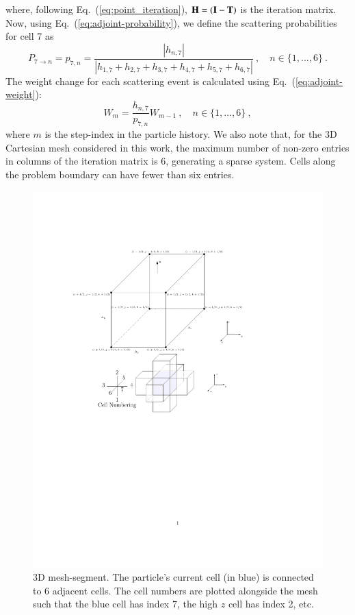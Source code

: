 \documentclass[preprint,12pt]{elsarticle}
\newcommand{\vI}{\ensuremath{\ve{I}}}
\begin{document}
where, following Eq.~(\ref{eq:point_iteration}), $\ve{H} = (\vI - \ve{T})$ is
the iteration matrix.  Now, using Eq.~(\ref{eq:adjoint-probability}), we
define the scattering probabilities for cell 7 as
\begin{equation*}
  P_{7\rightarrow n} = p_{7,n} = \frac{|h_{n,7}|}{|h_{1,7} + h_{2,7} +
    h_{3,7} + h_{4,7} + h_{5,7} + h_{6,7}|}\:,\quad n\in
  \{1,\ldots,6\}\:.
\end{equation*}
The weight change for each scattering event is calculated using
Eq.~(\ref{eq:adjoint-weight}):
\begin{equation*}
  W_{m} = \frac{h_{n,7}}{p_{7,n}}W_{m-1}\:,\quad n\in
  \{1,\ldots,6\}\:,
\end{equation*}
where $m$ is the step-index in the particle history.  We also note that, for
the 3D Cartesian mesh considered in this work, the maximum number of non-zero
entries in columns of the iteration matrix is 6, generating a sparse system.
Cells along the problem boundary can have fewer than six entries.
\begin{figure}[ht!]
  \centerline{ \includegraphics[clip]{3D_mesh_segment.pdf}}
  \caption{3D mesh-segment.  The particle's current cell (in blue) is
    connected to 6 adjacent cells.  The cell numbers are plotted
    alongside the mesh such that the blue cell has index 7, the high
    $z$ cell has index 2, etc.}
  \label{fig:mesh_segment}
\end{figure}
\end{document}
